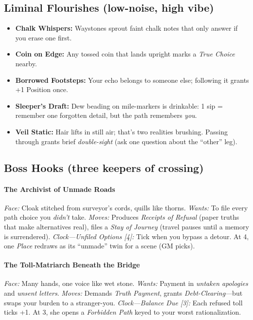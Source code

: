 \subsection*{Liminal Flourishes (low-noise, high vibe)}
\begin{itemize}
  \item \textbf{Chalk Whispers:} Waystones sprout faint chalk notes that only answer if you erase one first.
  \item \textbf{Coin on Edge:} Any tossed coin that lands upright marks a \emph{True Choice} nearby.
  \item \textbf{Borrowed Footsteps:} Your echo belongs to someone else; following it grants +1 Position once.
  \item \textbf{Sleeper’s Draft:} Dew beading on mile-markers is drinkable: 1 sip = remember one forgotten detail, but the path remembers \emph{you}.
  \item \textbf{Veil Static:} Hair lifts in still air; that’s two realities brushing. Passing through grants brief \emph{double-sight} (ask one question about the “other” leg).
\end{itemize}

\subsection*{Boss Hooks (three keepers of crossing)}
\paragraph*{The Archivist of Unmade Roads}
\emph{Face:} Cloak stitched from surveyor’s cords, quills like thorns.  
\emph{Wants:} To file every path choice you \emph{didn’t} take.  
\emph{Moves:} Produces \emph{Receipts of Refusal} (paper truths that make alternatives real), files a \emph{Stay of Journey} (travel pauses until a memory is surrendered).  
\emph{Clock—Unfiled Options [4]:} Tick when you bypass a detour. At 4, one \emph{Place} redraws as its “unmade” twin for a scene (GM picks).

\paragraph*{The Toll-Matriarch Beneath the Bridge}
\emph{Face:} Many hands, one voice like wet stone.  
\emph{Wants:} Payment in \emph{untaken apologies} and \emph{unsent letters}.  
\emph{Moves:} Demands \emph{Truth Payment}, grants \emph{Debt-Clearing}—but swaps your burden to a stranger-you.  
\emph{Clock—Balance Due [3]:} Each refused toll ticks +1. At 3, she opens a \emph{Forbidden Path} keyed to your worst rationalization.

